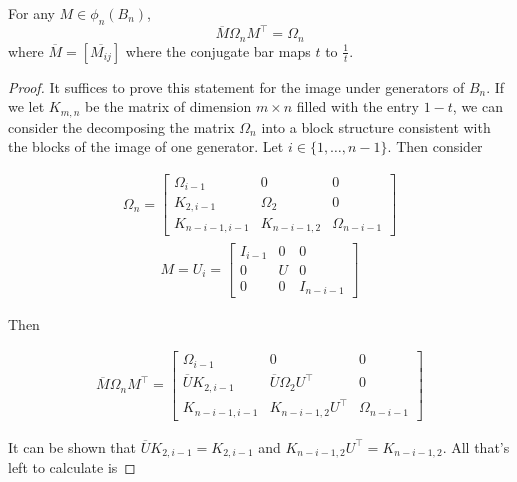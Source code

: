 \begin{theorem}
	For any $M\in \phi_n(B_n)$, 
$$\overline{M}\Omega_nM^\intercal = \Omega_n$$
where $\overline{M}=[\overline{M_{ij}}]$ where the conjugate bar maps $t$ to $\frac{1}{t}$.
\end{theorem}

\noindent\begin{proof}\cite{Kassel}  It suffices to prove this statement for the image under generators of $B_n$. If we let $K_{m,n}$ be the matrix of dimension $m\times n$ filled with the entry $1-t$, we can consider the decomposing the matrix $\Omega_n$ into a block structure consistent with the blocks of the image of one generator. Let $i\in\{1,\hdots,n-1\}$. Then consider 

\begin{equation}
	\begin{aligned}
		\Omega_n = \begin{bmatrix}
							\Omega_{i-1} & 0 & 0\\
							K_{2,i-1} & \Omega_2 & 0 \\
							K_{n-i-1,i-1}& K_{n-i-1,2}&\Omega_{n-i-1}
						\end{bmatrix}
	\end{aligned}
\end{equation}
\begin{equation}
	\begin{aligned}
		M = U_i = \begin{bmatrix}
							I_{i-1} & 0 & 0\\
							0 & U & 0 \\
							0& 0&I_{n-i-1}
						\end{bmatrix}
	\end{aligned}
\end{equation}

Then

\begin{equation}
	\begin{aligned}
		\overline{M}\Omega_nM^\intercal = \begin{bmatrix}
														\Omega_{i-1} & 0 & 0\\
														\overline{U}K_{2,i-1} & \overline{U}\Omega_2U^\intercal & 0 \\
														K_{n-i-1,i-1}& K_{n-i-1,2}U^\intercal&\Omega_{n-i-1}
													\end{bmatrix}
	\end{aligned}
\end{equation}

It can be shown that $\overline{U}K_{2,i-1} = K_{2,i-1}$ and $K_{n-i-1,2}U^\intercal=K_{n-i-1,2}$. All that's left to calculate is 



\end{proof}
